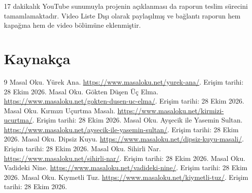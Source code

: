\documentclass[12pt,a4paper]{article}
\begin{document}
17 dakikalık YouTube sunumuyla projenin açıklanması da raporun teslim sürecini tamamlamaktadır. Video Liste Dışı olarak paylaşılmış ve bağlantı raporun hem kapağına hem de video bölümüne eklenmiştir.

\section{Kaynakça}
\begin{thebibliography}{9}
 Masal Oku. Yürek Ana. \url{https://www.masaloku.net/yurek-ana/}. Erişim tarihi: 28 Ekim 2026.
 Masal Oku. Gökten Düşen Üç Elma. \url{https://www.masaloku.net/gokten-dusen-uc-elma/}. Erişim tarihi: 28 Ekim 2026.
 Masal Oku. Kırmızı Uçurtma Masalı. \url{https://www.masaloku.net/kirmizi-ucurtma/}. Erişim tarihi: 28 Ekim 2026.
 Masal Oku. Ayşecik ile Yasemin Sultan. \url{https://www.masaloku.net/aysecik-ile-yasemin-sultan/}. Erişim tarihi: 28 Ekim 2026.
 Masal Oku. Dipsiz Kuyu. \url{https://www.masaloku.net/dipsiz-kuyu-masali/}. Erişim tarihi: 28 Ekim 2026.
 Masal Oku. Sihirli Nar. \url{https://www.masaloku.net/sihirli-nar/}. Erişim tarihi: 28 Ekim 2026.
 Masal Oku. Vadideki Nine. \url{https://www.masaloku.net/vadideki-nine/}. Erişim tarihi: 28 Ekim 2026.
 Masal Oku. Kıymetli Tuz. \url{https://www.masaloku.net/kiymetli-tuz/}. Erişim tarihi: 28 Ekim 2026.
\end{thebibliography}
\end{document}
